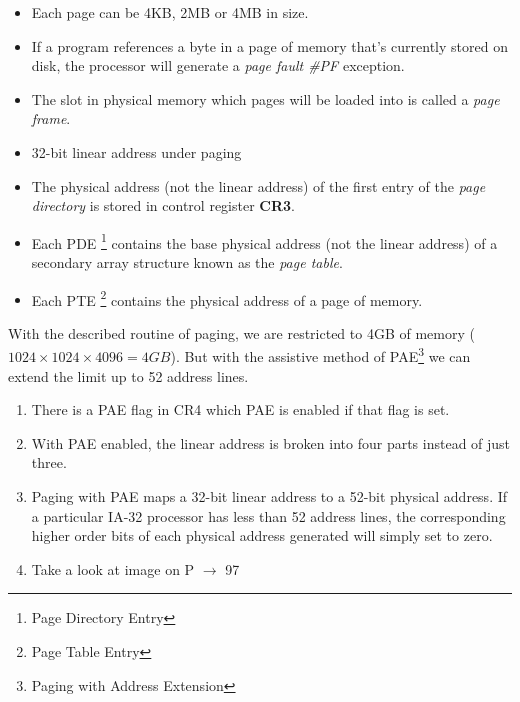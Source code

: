 \begin{note}
\begin{itemize}
\item Each page can be 4KB, 2MB or 4MB in size.
\item If a program references a byte in a page of memory that's currently stored on disk, the processor will generate a \textit{page fault \#PF} exception.
\item The slot in physical memory which pages will be loaded into is called a \textit{page frame}.
\item 32-bit linear address under paging

\item The physical address (not the linear address) of the first entry of the \textit{page directory} is stored in control register \textbf{CR3}.
\item Each PDE \footnote{Page Directory Entry} contains the base physical address (not the linear address) of a secondary array structure known as the \textit{page table}.
\item Each PTE \footnote{Page Table Entry} contains the physical address of a page of memory.
\end{itemize}


With the described routine of paging, we are restricted to 4GB of memory ($1024 \times 1024 \times 4096 = 4GB$). But with the assistive method of PAE\footnote{Paging with Address Extension} we can extend the limit up to 52 address lines.
\end{note}

\begin{note}
\begin{enumerate}
\item There is a PAE flag in CR4 which PAE is enabled if that flag is set.
\item With PAE enabled, the linear address is broken into four parts instead of just three.

\item Paging with PAE maps a 32-bit linear address to a 52-bit physical address. If a particular IA-32 processor has less than 52 address lines, the corresponding higher order bits of each physical address generated will simply set to zero.
\item Take a look at image on P $\rightarrow$ 97
\end{enumerate}
\end{note}

